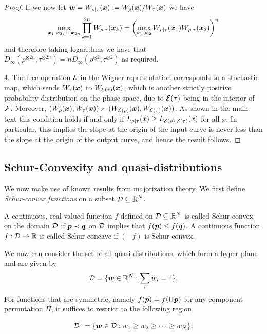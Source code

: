 \documentclass[pra,
aps,
twocolumn,
superscriptaddress,
groupedaddress,
nofootinbib,
reprint
]{revtex4-1}
\begin{document}
\begin{proof}
If we now let $\boldsymbol{w} = W_{\rho|\tau}(\boldsymbol{x}) := W_{\rho}(\boldsymbol{x}) /W_{\tau}(\boldsymbol{x})$ we have
\begin{equation}
\max_{\boldsymbol{x}_1, \boldsymbol{x}_2, \dots ,\boldsymbol{x}_{2n}} \prod_{k=1}^{2n} W_{\rho|\tau}(\boldsymbol{x}_k) = \left( \max_{\boldsymbol{x}_1, \boldsymbol{x}_2} W_{\rho|\tau}(\boldsymbol{x}_1)W_{\rho|\tau}(\boldsymbol{x}_2) \right)^n
\end{equation}
and therefore taking logarithms we have that $D_\infty (\rho^{\otimes 2n}, \tau^{\otimes 2n}) = n D_\infty(\rho^{\otimes 2} ,\tau^{\otimes 2})$ as required.

4. The free operation ${\mathcal E}$ in the Wigner representation corresponds to a stochastic map, which sends $W_\tau(\boldsymbol{x})$ to $W_{{\mathcal E}(\tau)}(\boldsymbol{x})$, which is another strictly positive probability distribution on the phase space, due to ${\mathcal E}(\tau)$ being in the interior of ${\mathcal F}$. Moreover, $(W_\rho(\boldsymbol{x}), W_\tau(\boldsymbol{x}) ) \succ (W_{{\mathcal E}(\rho)}(\boldsymbol{x}) , W_{{\mathcal E}(\tau)}(\boldsymbol{x}))$. As shown in the main text this condition holds if and only if $L_{\rho|\tau}(x) \ge L_{{\mathcal E}(\rho)|{\mathcal E}(\tau)}(x)$ for all $x$. In particular, this implies the slope at the origin of the input curve is never less than the slope at the origin of the output curve, and hence the result follows.
\end{proof}

\newpage

\subsection{Schur-Convexity and quasi-distributions}
We now make use of known results from majorization theory. We first define \emph{Schur-convex functions} on a subset ${\mathcal D} \subseteq \mathbb{R}^N$.

\begin{definition} A continuous, real-valued function $f$ defined on ${\mathcal D} \subseteq \mathbb{R}^N$ is called Schur-convex on the domain ${\mathcal D}$ if $\boldsymbol{p} \prec \boldsymbol{q}$ on ${\mathcal D}$ implies that $f(\boldsymbol{p}) \le f(\boldsymbol{q})$. A continuous function $f:{\mathcal D} \rightarrow \mathbb{R}$ is called Schur-concave if $(-f)$ is Schur-convex.
\end{definition}
We now can consider the set of all quasi-distributions, which form a hyper-plane and are given by
\begin{equation}
{\mathcal D} = \{ \boldsymbol{w} \in \mathbb{R}^N: \sum_i w_i = 1\}.
\end{equation}
For functions that are symmetric, namely $f(\boldsymbol{p}) = f(\Pi \boldsymbol{p})$ for any component permutation $\Pi$, it suffices to restrict to the following region,

\begin{equation}
{\mathcal D}^\downarrow = \{ \boldsymbol{w} \in {\mathcal D} : w_1 \ge w_2 \ge \cdots \ge w_N\}.
\end{equation}
\end{document}
